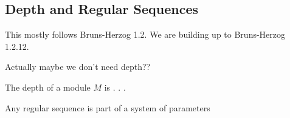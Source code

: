 \begin{comment}
\begin{lemma}
  \label{lem:assoc_iff_minimal_in_support}
  \uses{prop:assoc_primes_in_support}
  The assocated primes of $M$ are precisely
  the primes which are minimal in the support of $M$.
\end{lemma}


\begin{lemma}
  \label{lem:assoc_prime_zero_divisor}
  \uses{thm:first_uniqueness_primary_decomposition}
  An element $x \in R$ is a zero-divisor iff
  it is in an associated prime.
  (geometrically, it vanishes at an associated point)
\end{lemma}

\end{comment}



\subsection{Depth and Regular Sequences}

This mostly follows Bruns-Herzog 1.2.
We are building up to Bruns-Herzog 1.2.12.

Actually maybe we don't need depth??

\begin{definition}
  \label{def:depth}
  The depth of a module $M$ is . . . 
\end{definition}

\begin{theorem}[BH 1.2.12]
  \label{thm:reg_seq_part_of_sys_param}
  Any regular sequence is part of a system of parameters
\end{theorem}

